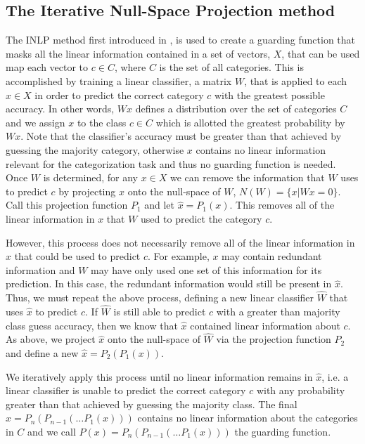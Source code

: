 \documentclass[11pt,a4paper]{article}
\begin{document}
\subsection{The Iterative Null-Space Projection method}
\label{sec:inlp-method}

The INLP method first introduced in \citep{inlp}, is used to create a guarding function that masks all the linear information contained in a set of vectors, $X$, that can be used map each vector to $c \in C$, where $C$ is the set of all categories. This is accomplished by training a linear classifier, a matrix $W$, that is applied to each $x \in X$ in order to predict the correct category $c$ with the greatest possible accuracy. In other words, $Wx$ defines a distribution over the set of categories $C$ and we assign $x$ to the class $c \in C$ which is allotted the greatest probability by $Wx$. Note that the classifier's accuracy must be greater than that achieved by guessing the majority category, otherwise $x$ contains no linear information relevant for the categorization task and thus no guarding function is needed. Once $W$ is determined, for any $x \in X$ we can remove the information that $W$ uses to predict $c$ by projecting $x$ onto the null-space of $W$, $N(W) = \{x | Wx=0\}$. Call this projection function $P_1$ and let $\hat{x} = P_1(x)$. This removes all of the linear information in $x$ that $W$ used to predict the category $c$. 

However, this process does not necessarily remove all of the linear information in $x$ that could be used to predict $c$. For example, $x$ may contain redundant information and $W$ may have only used one set of this information for its prediction. In this case, the redundant information would still be present in $\hat{x}$. Thus, we must repeat the above process, defining a new linear classifier $\hat{W}$ that uses $\hat{x}$  to predict $c$. If $\hat{W}$ is still able to predict $c$ with a greater than majority class guess accuracy, then we know that $\hat{x}$ contained linear information about $c$. As above, we project $\hat{x}$ onto the null-space of $\hat{W}$ via the projection function $P_2$ and define a new $\hat{x} = P_2(P_1(x))$.

We iteratively apply this process until no linear information remains in $\hat{x}$, i.e. a linear classifier is unable to predict the correct category $c$ with any probability greater than that achieved by guessing the majority class. The final $\hat{x} = P_n(P_{n-1}(\dots P_1(x)))$ contains no linear information about the categories in $C$ and we call $P(x) = P_n(P_{n-1}(\dots P_1(x)))$ the guarding function. 
\end{document}
